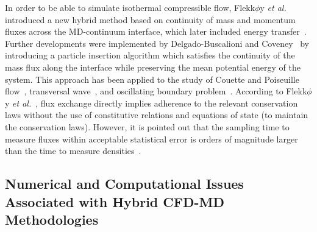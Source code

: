 \documentclass[preprint,12pt]{elsarticle}
\begin{document}
In order to be able to simulate isothermal compressible flow, Flekk$\phi$y {\it{et al.}}~\cite{Flekkoy} introduced a new hybrid method based on continuity of mass and momentum fluxes across the MD-continuum interface, which later included energy transfer~\cite{Wagner,Delgado1}. Further developments were implemented by Delgado-Buscalioni and Coveney~\cite{USHER} by introducing a particle insertion algorithm which satisfies the continuity of the mass flux along the interface while preserving the mean potential energy of the system. This approach has been applied to the study of Couette and Poiseuille flow~\cite{Flekkoy}, transversal wave~\cite{Delgado1}, and oscillating boundary problem~\cite{Time_Mechanism}. According to Flekk$\phi$y {\it{et al.}}~\cite{Flekkoy}, flux exchange directly implies adherence to the relevant conservation laws without the use of constitutive relations and equations of state (to maintain the conservation laws). However, it is pointed out that the sampling time to measure fluxes within acceptable statistical error is orders of magnitude larger than the time to measure densities~\cite{Hadjicon3}.



\subsection{Numerical and Computational Issues Associated with Hybrid CFD-MD Methodologies}
\label{sec:intro_issues}
\end{document}
